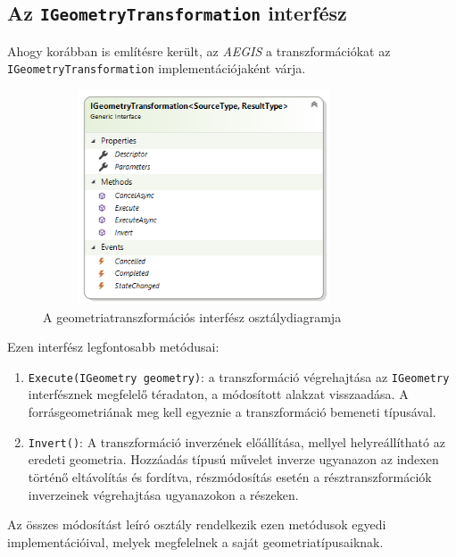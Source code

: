 \subsection{Az \texttt{IGeometryTransformation} interfész}
Ahogy korábban is említésre került, az \emph{AEGIS} a transzformációkat az \texttt{IGeometryTransformation} implementációjaként várja. 
\begin{figure}[H]
	\centering
	\includegraphics[width=0.85\textwidth,height=240px]{images/GeomTransformIface.png}
	\caption{A geometriatranszformációs interfész osztálydiagramja}
	\label{fig:picture-9}
\end{figure}
Ezen interfész legfontosabb metódusai:
\begin{enumerate}
	\item \texttt{Execute(IGeometry geometry)}: a transzformáció végrehajtása az \texttt{IGeometry} interfésznek megfelelő téradaton, a módosított alakzat visszaadása. A forrásgeometriának meg kell egyeznie a transzformáció bemeneti típusával.
	\item \texttt{Invert()}: A transzformáció inverzének előállítása, mellyel helyreállítható az eredeti geometria. Hozzáadás típusú művelet inverze ugyanazon az indexen történő eltávolítás és fordítva, részmódosítás esetén a résztranszformációk inverzeinek végrehajtása ugyanazokon a részeken.
\end{enumerate}
Az összes módosítást leíró osztály rendelkezik ezen metódusok egyedi implementációival, melyek megfelelnek a saját geometriatípusaiknak.
